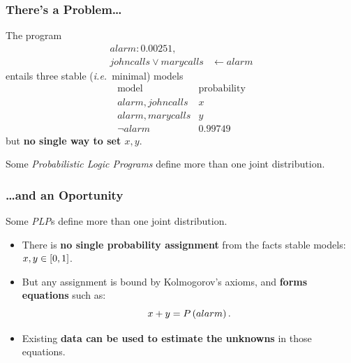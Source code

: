 \documentclass[bigger]{beamer}
\begin{document}
\begin{frame}
    \frametitle{There's a Problem\ldots}
    \vfill
    The program
    $$
        \begin{aligned}
            alarm:0.00251,           &                  \\
            johncalls \vee marycalls & \leftarrow alarm
        \end{aligned}
    $$
    entails three \alert{stable}  (\emph{i.e.}\ minimal) models
    $$
        \begin{array}{r|l}
            \text{model}     & \text{probability} \\
            \hline
            alarm, johncalls & x                  \\
            alarm, marycalls & y                  \\
            \neg alarm       & 0.99749
        \end{array}
    $$
    but \textbf{no single way to set $x,y$}.
    \vfill
    \begin{center}
        Some \emph{Probabilistic Logic Programs} define more than one joint distribution.
    \end{center}
\end{frame}
%
\begin{frame}
    \frametitle{\ldots and an Oportunity}
    \begin{center}
        Some \emph{PLP}s define more than one joint distribution.
    \end{center}
    \vfill
    \begin{itemize}
        \item There is \textbf{no single probability assignment} from the facts stable models: $x,y \in \intcc{0,1}$.
        \item But any assignment is bound by Kolmogorov's axioms, and \textbf{forms equations} such as:
              $$x + y = P\del{alarm}.$$
        \item Existing \textbf{data can be used to estimate the unknowns} in those equations.
    \end{itemize}
    \vfill
\end{frame}
\end{document}
